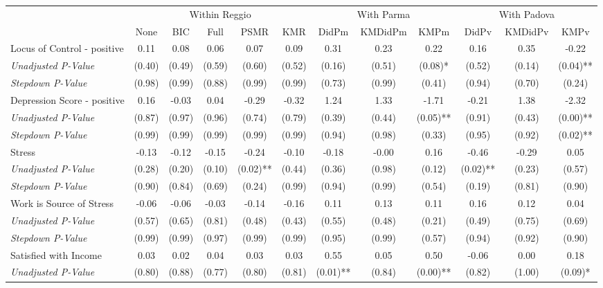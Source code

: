 \begin{tabular}{l c c c c c c c c c c c}
\toprule
& \multicolumn{5}{c}{Within Reggio} & \multicolumn{3}{c}{With Parma} & \multicolumn{3}{c}{With Padova} \\\cmidrule(lr){2-6} \cmidrule(lr){7-9} \cmidrule(lr){10-12}
 & None & BIC & Full & PSMR & KMR & DidPm & KMDidPm & KMPm & DidPv & KMDidPv & KMPv \\
\midrule
Locus of Control - positive & 0.11 & 0.08 & 0.06 & 0.07 & 0.09 & 0.31 & 0.23 & 0.22 & 0.16 & 0.35 & -0.22 \\
\quad \textit{Unadjusted P-Value} & (0.40) & (0.49) & (0.59) & (0.60) & (0.52) & (0.16) & (0.51) & (0.08)* & (0.52) & (0.14) & (0.04)** \\
\quad \textit{Stepdown P-Value} & (0.98) & (0.99) & (0.88) & (0.99) & (0.99) & (0.73) & (0.99) & (0.41) & (0.94) & (0.70) & (0.24) \\
Depression Score - positive & 0.16 & -0.03 & 0.04 & -0.29 & -0.32 & 1.24 & 1.33 & -1.71 & -0.21 & 1.38 & -2.32 \\
\quad \textit{Unadjusted P-Value} & (0.87) & (0.97) & (0.96) & (0.74) & (0.79) & (0.39) & (0.44) & (0.05)** & (0.91) & (0.43) & (0.00)** \\
\quad \textit{Stepdown P-Value} & (0.99) & (0.99) & (0.99) & (0.99) & (0.99) & (0.94) & (0.98) & (0.33) & (0.95) & (0.92) & (0.02)** \\
Stress & -0.13 & -0.12 & -0.15 & -0.24 & -0.10 & -0.18 & -0.00 & 0.16 & -0.46 & -0.29 & 0.05 \\
\quad \textit{Unadjusted P-Value} & (0.28) & (0.20) & (0.10) & (0.02)** & (0.44) & (0.36) & (0.98) & (0.12) & (0.02)** & (0.23) & (0.57) \\
\quad \textit{Stepdown P-Value} & (0.90) & (0.84) & (0.69) & (0.24) & (0.99) & (0.94) & (0.99) & (0.54) & (0.19) & (0.81) & (0.90) \\
Work is Source of Stress & -0.06 & -0.06 & -0.03 & -0.14 & -0.16 & 0.11 & 0.13 & 0.11 & 0.16 & 0.12 & 0.04 \\
\quad \textit{Unadjusted P-Value} & (0.57) & (0.65) & (0.81) & (0.48) & (0.43) & (0.55) & (0.48) & (0.21) & (0.49) & (0.75) & (0.69) \\
\quad \textit{Stepdown P-Value} & (0.99) & (0.99) & (0.97) & (0.99) & (0.99) & (0.95) & (0.99) & (0.57) & (0.94) & (0.92) & (0.90) \\
Satisfied with Income & 0.03 & 0.02 & 0.04 & 0.03 & 0.03 & 0.55 & 0.05 & 0.50 & -0.06 & 0.00 & 0.18 \\
\quad \textit{Unadjusted P-Value} & (0.80) & (0.88) & (0.77) & (0.80) & (0.81) & (0.01)** & (0.84) & (0.00)** & (0.82) & (1.00) & (0.09)* \\

\end{tabular}
